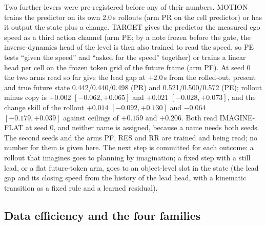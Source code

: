 \documentclass[10pt,twocolumn]{article}
\makeatletter
\theoremstyle{remark}
\renewcommand\paragraph{\@startsection{paragraph}{4}{\z@}{1.6ex \@plus .5ex \@minus .2ex}{-1em}{\normalfont\normalsize\bfseries}}
\makeatother
\begin{document}
\paragraph{Two levers, seed 0 only.} Two further levers were pre-registered before any of their numbers. MOTION trains the
predictor on its own 2.0\,s rollouts (arm PR on the cell predictor) or has it output the state plus a change. TARGET gives the
predictor the measured ego speed as a third action channel (arm PE; by a note frozen before the gate, the inverse-dynamics head
of the level is then also trained to read the speed, so PE tests ``given the speed'' and ``asked for the speed'' together) or
trains a linear head per cell on the frozen token grid of the future frame (arm PF). At seed 0 the two arms read so far give the
lead gap at $+2.0$\,s from the rolled-out, present and true future state 0.442/0.440/0.498 (PR) and 0.521/0.500/0.572 (PE);
rollout minus copy is $+0.002$ $[-0.062,+0.065]$ and $+0.021$ $[-0.028,+0.073]$, and the change skill of the rollout $+0.014$
$[-0.092,+0.130]$ and $-0.064$ $[-0.179,+0.039]$ against ceilings of $+0.159$ and $+0.206$. Both read IMAGINE-FLAT at seed 0, and
neither name is assigned, because a name needs both seeds. The second seeds and the arms PF, RES and RR are trained and being
read; no number for them is given here. The next step is committed for each outcome: a rollout that imagines goes to planning by
imagination; a fixed step with a still lead, or a flat future-token arm, goes to an object-level slot in the state (the lead gap
and its closing speed from the history of the lead head, with a kinematic transition as a fixed rule and a learned residual).

\subsection{Data efficiency and the four families}\label{sec:dataeff}
\end{document}
